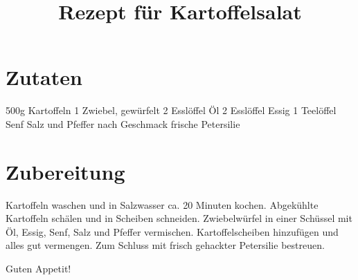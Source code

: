 \documentclass[a4paper]{article}
\title{Rezept für Kartoffelsalat}
\date{}
\begin{document}
\maketitle

\section*{Zutaten}

500g Kartoffeln
1 Zwiebel, gewürfelt
2 Esslöffel Öl
2 Esslöffel Essig
1 Teelöffel Senf
Salz und Pfeffer nach Geschmack
frische Petersilie

\section*{Zubereitung}

Kartoffeln waschen und in Salzwasser ca. 20 Minuten kochen.
Abgekühlte Kartoffeln schälen und in Scheiben schneiden.
Zwiebelwürfel in einer Schüssel mit Öl, Essig, Senf, Salz und Pfeffer vermischen.
Kartoffelscheiben hinzufügen und alles gut vermengen.
Zum Schluss mit frisch gehackter Petersilie bestreuen.

Guten Appetit!
\end{document}
